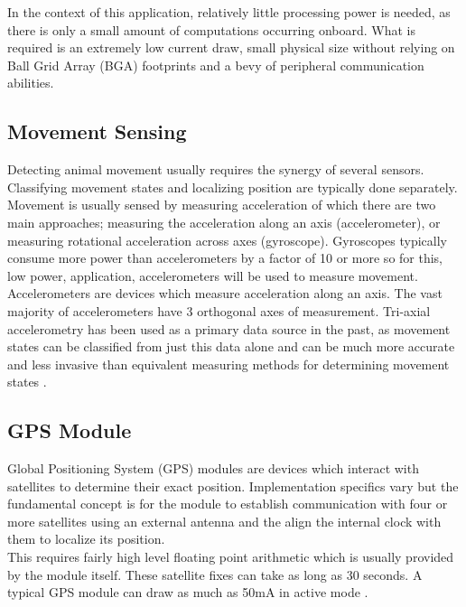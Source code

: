 \documentclass[12pt,openany,a4paper]{book}
\begin{document}
		In the context of this application, relatively little processing power is needed, as there is only a small amount of computations occurring onboard. What is required is an extremely low current draw, small physical size without relying on Ball Grid Array (BGA) footprints and a bevy of peripheral communication abilities. 
		
		\subsection{Movement Sensing}
			Detecting animal movement usually requires the synergy of several sensors. Classifying movement states and localizing position are typically done separately. Movement is usually sensed by measuring acceleration of which there are two main approaches; measuring the acceleration along an axis (accelerometer), or measuring rotational acceleration across axes (gyroscope). Gyroscopes typically consume more power than accelerometers by a factor of 10 or more \cite{InvenMPU9150} so for this, low power, application, accelerometers will be used to measure movement. \\
			
			Accelerometers are devices which measure acceleration along an axis. The vast majority of accelerometers have 3 orthogonal axes of measurement. Tri-axial accelerometry has been used as a primary data source in the past, as movement states can be classified from just this data alone \cite{Ran12, Shepard08} and can be much more accurate and less invasive than equivalent measuring methods for determining movement states \cite{Terrill13, Lamprecht14}. 
			
		\subsection{GPS Module}
			Global Positioning System (GPS) modules are devices which interact with satellites to determine their exact position. Implementation specifics vary but the fundamental concept is for the module to establish communication with four or more satellites using an external antenna and the align the internal clock with them to localize its position. \\
			
			This requires fairly high level floating point arithmetic which is usually provided by the module itself. These satellite fixes can take as long as 30 seconds. A typical GPS module can draw as much as 50mA in active mode \cite{Carroll10}.
			
\end{document}
